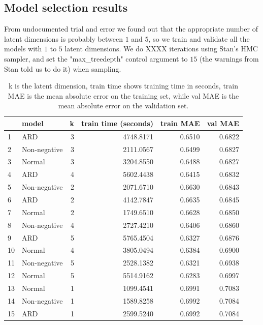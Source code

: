 \documentclass[12pt]{article}
\begin{document}
    \subsection{Model selection results}
    From undocumented trial and error we found out that the appropriate number of latent dimensions is probably between $1$ and $5$, so we train and validate all the models with $1$ to $5$ latent dimensions. We do XXXX iterations using Stan's HMC sampler, and set the "max\_treedepth" control argument to $15$ (the warnings from Stan told us to do it) when sampling.
    \begin{table}[H]
        \centering
        \caption{k is the latent dimension, train time shows training time in seconds, train MAE is the mean absolute error on the training set, while val MAE is the mean absolute error on the validation set.}
        \begin{tabular}{llrr|rr}
            \toprule
            {} &         model &  k &  train time (seconds) &  train MAE &  val MAE \\
            \midrule
            1  &           ARD &  3 &             4748.8171 &     0.6510 &   0.6822 \\
            2  &  Non-negative &  3 &             2111.0567 &     0.6499 &   0.6827 \\
            3  &        Normal &  3 &             3204.8550 &     0.6488 &   0.6827 \\
            4  &           ARD &  4 &             5602.4438 &     0.6415 &   0.6832 \\
            5  &  Non-negative &  2 &             2071.6710 &     0.6630 &   0.6843 \\
            6  &           ARD &  2 &             4142.7847 &     0.6635 &   0.6845 \\
            7  &        Normal &  2 &             1749.6510 &     0.6628 &   0.6850 \\
            8  &  Non-negative &  4 &             2727.4210 &     0.6406 &   0.6860 \\
            9  &           ARD &  5 &             5765.4504 &     0.6327 &   0.6876 \\
            10 &        Normal &  4 &             3805.0494 &     0.6384 &   0.6900 \\
            11 &  Non-negative &  5 &             2528.1382 &     0.6321 &   0.6938 \\
            12 &        Normal &  5 &             5514.9162 &     0.6283 &   0.6997 \\
            13 &        Normal &  1 &             1099.4541 &     0.6991 &   0.7083 \\
            14 &  Non-negative &  1 &             1589.8258 &     0.6992 &   0.7084 \\
            15 &           ARD &  1 &             2599.5240 &     0.6992 &   0.7084 \\
            \bottomrule
        \end{tabular}
    \end{table}
    
\end{document}
